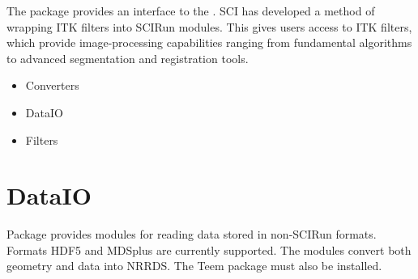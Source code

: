 The 
package provides an interface to the  .  SCI has developed a method of wrapping
ITK filters into SCIRun modules.  This gives \sr{} users access to
ITK filters, which provide image-processing capabilities ranging from
fundamental algorithms to advanced segmentation and registration
tools.

\begin{itemize}
\item Converters
\item DataIO
\item Filters
\end{itemize}

\section{DataIO}
\label{sec:dataiopackage}

Package 
provides modules for reading data stored in non-SCIRun formats.
Formats HDF5 and MDSplus are currently supported. The modules convert
both geometry and data into NRRDS. The Teem package must also be
installed.
